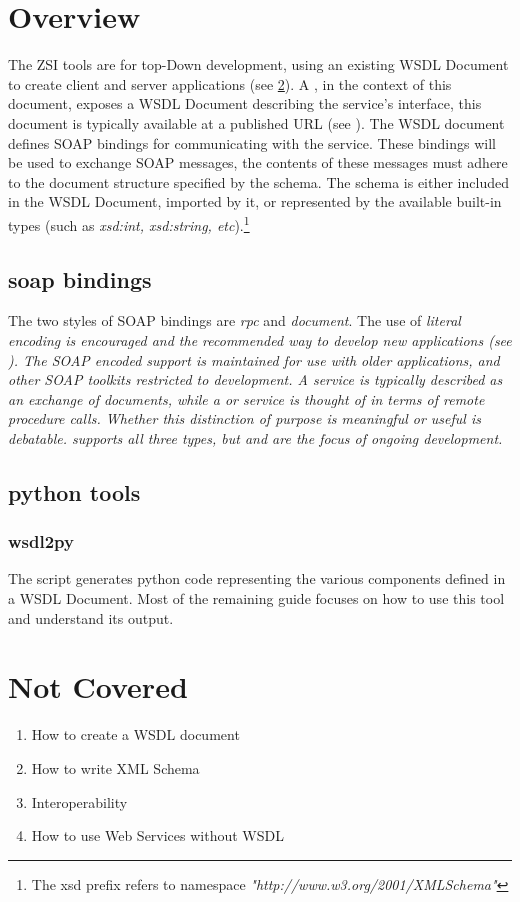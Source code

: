 \section{Overview}
The ZSI \WS tools are for top-Down \WS development, using an existing WSDL
Document to create client and server applications (see \ref{section:NC}). A \WS, in the context of this document, exposes a WSDL Document describing the
service's interface, this document is typically available at a published URL (see
\URL).  The WSDL document defines SOAP bindings for communicating with the 
service. These bindings will be used to exchange SOAP messages, the contents of
these messages must adhere to the document structure specified by the schema. The 
schema is either included in the WSDL Document, imported by it, or represented
by the available built-in types (such as \emph{xsd:int, xsd:string,
etc}).\footnote{The xsd prefix refers to namespace \it{"http://www.w3.org/2001/XMLSchema"}}

\subsection{soap bindings}
The two styles of SOAP bindings are \emph{rpc} and \emph{document}.  The use of
\it{literal} encoding is encouraged and the recommended way to develop new \WS
applications (see \WSI).  The SOAP \it{encoded} support is maintained for use
with older applications, and other SOAP toolkits restricted to \RPCENC development.  A
\DOCLIT service is typically described as an exchange of documents, while a
\RPCENC or \RPCLIT service is thought of in terms of remote procedure calls.
Whether this distinction of purpose is meaningful or useful is debatable.  \ZSI
supports all three types, but \RPCLIT and \DOCLIT are the focus of ongoing 
development.

\subsection{python tools}
\subsubsection{wsdl2py}
The \WPY script generates python code representing the various components
defined in a WSDL Document.  Most of the remaining guide focuses on how to use
this tool and understand its output.


\section{Not Covered}
\label{section:NC}
\begin{enumerate}
 \item{How to create a WSDL document}
 \item {How to write XML Schema}
 \item {Interoperability}
 \item{How to use Web Services without WSDL}
\end{enumerate}



